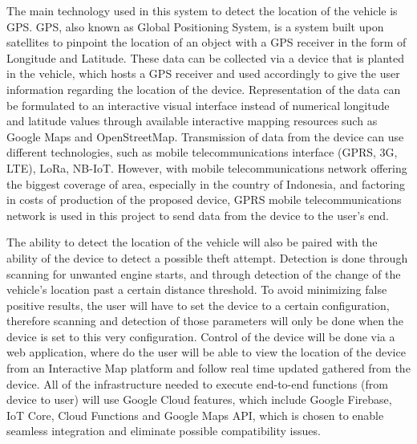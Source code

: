 \documentclass[conference]{IEEEtran}
\begin{document}
The main technology used in this system to detect the location of the vehicle is GPS. GPS, also known as Global Positioning System, is a system built upon satellites 
to pinpoint the location of an object with a GPS receiver in the form of Longitude and Latitude. These data can be collected via a device that is planted in the vehicle, 
which hosts a GPS receiver and used accordingly to give the user information regarding the location of the device. Representation of the data can be formulated to an interactive
visual interface instead of numerical longitude and latitude values through available interactive mapping resources such as Google Maps and OpenStreetMap. Transmission of data from 
the device can use different technologies, such as mobile telecommunications interface (GPRS, 3G, LTE), LoRa, NB-IoT. However, 
with mobile telecommunications network offering the biggest coverage of area, especially in the country of Indonesia, and factoring in costs of production of the proposed device, 
GPRS mobile telecommunications network is used in this project to send data from the device to the user's end.

The ability to detect the location of the vehicle will also be paired with the ability of the device to detect a possible theft attempt. Detection is done through scanning for unwanted engine starts, and through 
detection of the change of the vehicle's location past a certain distance threshold. To avoid minimizing false positive results, the user will have to set the device to a certain configuration, therefore scanning 
and detection of those parameters will only be done when the device is set to this very configuration. Control of the device will be done via a web application, where do the user will
be able to view the location of the device from an Interactive Map platform and follow real time updated gathered from the device. All of the infrastructure needed to execute end-to-end functions (from device to user) 
will use Google Cloud features, which include Google Firebase, IoT Core, Cloud Functions and Google Maps API, which is chosen to enable seamless integration and eliminate possible compatibility issues.
\end{document}
